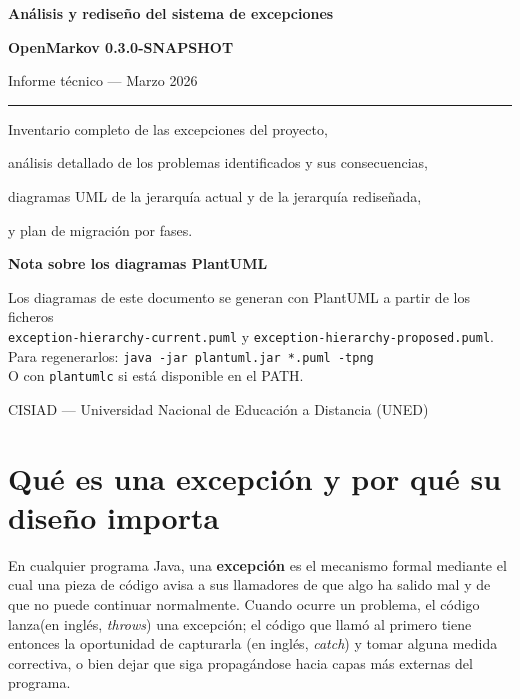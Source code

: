 \documentclass[11pt,a4paper]{article}
\begin{document}
\begin{titlepage}
    \centering
    \vspace*{2cm}
    {\Large\bfseries Análisis y rediseño del sistema de excepciones\par}
    \vspace{0.5em}
    {\large\bfseries OpenMarkov 0.3.0-SNAPSHOT\par}
    \vspace{1.5em}
    {\normalsize Informe técnico — Marzo 2026\par}
    \vspace{1em}
    \rule{0.6\textwidth}{0.4pt}\par
    \vspace{1em}
    {\small
        Inventario completo de las excepciones del proyecto,\par
        análisis detallado de los problemas identificados y sus consecuencias,\par
        diagramas UML de la jerarquía actual y de la jerarquía rediseñada,\par
        y plan de migración por fases.\par
    }
    \vspace{1.5em}
    \textbf{Nota sobre los diagramas PlantUML}\par
    \vspace{0.4em}
    {\small
        Los diagramas de este documento se generan con PlantUML a partir de los ficheros\\
        \texttt{exception-hierarchy-current.puml} y \texttt{exception-hierarchy-proposed.puml}.\\
        Para regenerarlos: \texttt{java -jar plantuml.jar *.puml -tpng}\\
        O con \texttt{plantumlc} si está disponible en el PATH.
    }
    \vfill
    {\small CISIAD — Universidad Nacional de Educación a Distancia (UNED)\par}
\end{titlepage}

\tableofcontents
\newpage

\section{Qué es una excepción y por qué su diseño importa}

En cualquier programa Java, una \textbf{excepción} es el mecanismo formal mediante el cual una
pieza de código avisa a sus llamadores de que algo ha salido mal y de que no puede continuar
normalmente. Cuando ocurre un problema, el código \guillemotleft lanza\guillemotright  (en inglés, \textit{throws}) una
excepción; el código que llamó al primero tiene entonces la oportunidad de \guillemotleft capturarla\guillemotright 
(en inglés, \textit{catch}) y tomar alguna medida correctiva, o bien dejar que siga
propagándose hacia capas más externas del programa.
\end{document}
